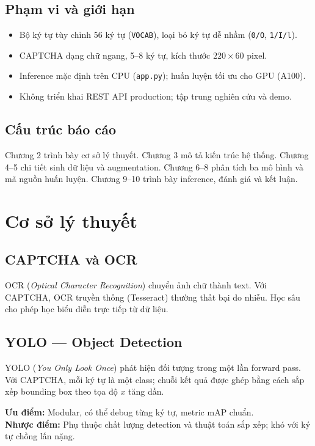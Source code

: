 \documentclass[a4paper,12pt]{report}
\begin{document}
\section{Phạm vi và giới hạn}
\begin{itemize}[leftmargin=*]
  \item Bộ ký tự tùy chỉnh 56 ký tự (\texttt{VOCAB}), loại bỏ ký tự dễ nhầm (\texttt{0/O}, \texttt{1/I/l}).
  \item CAPTCHA dạng chữ ngang, 5--8 ký tự, kích thước $220 \times 60$ pixel.
  \item Inference mặc định trên CPU (\texttt{app.py}); huấn luyện tối ưu cho GPU (A100).
  \item Không triển khai REST API production; tập trung nghiên cứu và demo.
\end{itemize}

\section{Cấu trúc báo cáo}
Chương 2 trình bày cơ sở lý thuyết. Chương 3 mô tả kiến trúc hệ thống. Chương 4--5 chi tiết sinh dữ liệu và augmentation. Chương 6--8 phân tích ba mô hình và mã nguồn huấn luyện. Chương 9--10 trình bày inference, đánh giá và kết luận.

\chapter{Cơ sở lý thuyết}

\section{CAPTCHA và OCR}
OCR (\textit{Optical Character Recognition}) chuyển ảnh chữ thành text. Với CAPTCHA, OCR truyền thống (Tesseract) thường thất bại do nhiễu. Học sâu cho phép học biểu diễn trực tiếp từ dữ liệu.

\section{YOLO --- Object Detection}
YOLO (\textit{You Only Look Once}) phát hiện đối tượng trong một lần forward pass. Với CAPTCHA, mỗi ký tự là một class; chuỗi kết quả được ghép bằng cách sắp xếp bounding box theo tọa độ $x$ tăng dần.

\textbf{Ưu điểm:} Modular, có thể debug từng ký tự, metric mAP chuẩn.\\
\textbf{Nhược điểm:} Phụ thuộc chất lượng detection và thuật toán sắp xếp; khó với ký tự chồng lấn nặng.
\end{document}
